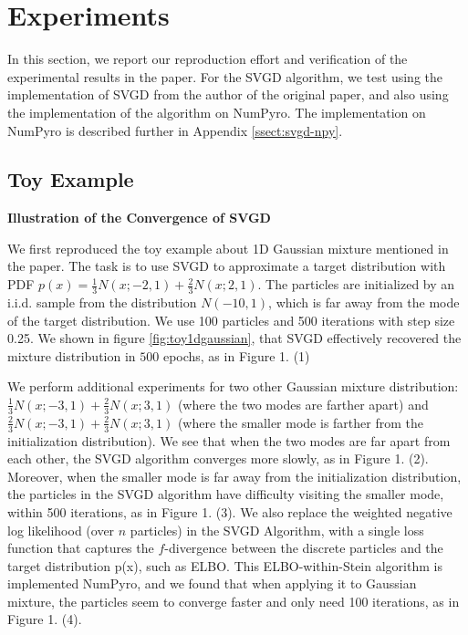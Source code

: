 \section{Experiments}
In this section, we report our reproduction effort and verification of the experimental results in the paper. For the SVGD algorithm, we test using the implementation of SVGD from the author of the original paper, and also using the implementation of the algorithm on NumPyro. The implementation on NumPyro is described further in Appendix \ref{ssect:svgd-npy}.

\subsection{Toy Example}


\noindent\textbf{Illustration of the Convergence of SVGD}

We first reproduced the toy example about 1D Gaussian mixture mentioned in the paper. The task is to use SVGD to approximate a target distribution with PDF $p(x) = \frac{1}{3} N(x; -2, 1) + \frac{2}{3} N(x; 2, 1)$. The particles are initialized by an i.i.d. sample from the distribution $N(-10, 1)$, which is far away from the mode of the target distribution. We use 100 particles and 500 iterations with step size 0.25. We shown in figure \ref{fig:toy1dgaussian}, that SVGD effectively recovered the mixture distribution in $500$ epochs, as in Figure 1. (1)

We perform additional experiments for two other Gaussian mixture distribution: $\frac{1}{3} N(x; -3, 1) + \frac{2}{3} N(x; 3, 1)$ (where the two modes are farther apart) and $\frac{2}{3} N(x; -3, 1) + \frac{2}{3} N(x; 3, 1)$ (where the smaller mode is farther from the initialization distribution). We see that when the two modes are far apart from each other, the SVGD algorithm converges more slowly, as in Figure 1. (2). Moreover, when the smaller mode is far away from the initialization distribution, the particles in the SVGD algorithm have difficulty visiting the smaller mode, within 500 iterations, as in Figure 1. (3). We also replace the weighted negative log likelihood (over $n$ particles) in the SVGD Algorithm, with a single loss function that captures the $f$-divergence between the discrete particles and the target distribution p(x), such as ELBO. This ELBO-within-Stein algorithm is implemented NumPyro, and we found that when applying it to Gaussian mixture, the particles seem to converge faster and only need 100 iterations, as in Figure 1. (4).

